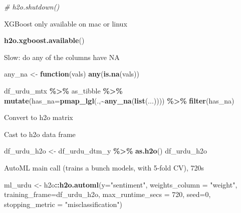 \documentclass[
]{article}
\newenvironment{Shaded}{\begin{snugshade}}{\end{snugshade}}
\newcommand{\CommentTok}[1]{\textcolor[rgb]{0.56,0.35,0.01}{\textit{#1}}}
\newcommand{\ControlFlowTok}[1]{\textcolor[rgb]{0.13,0.29,0.53}{\textbf{#1}}}
\newcommand{\DataTypeTok}[1]{\textcolor[rgb]{0.13,0.29,0.53}{#1}}
\newcommand{\DecValTok}[1]{\textcolor[rgb]{0.00,0.00,0.81}{#1}}
\newcommand{\KeywordTok}[1]{\textcolor[rgb]{0.13,0.29,0.53}{\textbf{#1}}}
\newcommand{\NormalTok}[1]{#1}
\newcommand{\OperatorTok}[1]{\textcolor[rgb]{0.81,0.36,0.00}{\textbf{#1}}}
\newcommand{\StringTok}[1]{\textcolor[rgb]{0.31,0.60,0.02}{#1}}
\begin{document}
\begin{Shaded}
\begin{Highlighting}[]
\CommentTok{\# h2o.shutdown()}
\end{Highlighting}
\end{Shaded}

XGBoost only available on mac or linux

\begin{Shaded}
\begin{Highlighting}[]
\KeywordTok{h2o.xgboost.available}\NormalTok{()}
\end{Highlighting}
\end{Shaded}

Slow: do any of the columns have NA

\begin{Shaded}
\begin{Highlighting}[]
\NormalTok{any\_na \textless{}{-}}\StringTok{ }\ControlFlowTok{function}\NormalTok{(vals) }\KeywordTok{any}\NormalTok{(}\KeywordTok{is.na}\NormalTok{(vals))}

\NormalTok{df\_urdu\_mtx }\OperatorTok{\%\textgreater{}\%}\StringTok{ }\NormalTok{as\_tibble }\OperatorTok{\%\textgreater{}\%}
\StringTok{  }\KeywordTok{mutate}\NormalTok{(}\DataTypeTok{has\_na=}\KeywordTok{pmap\_lgl}\NormalTok{(.,}\OperatorTok{\textasciitilde{}}\KeywordTok{any\_na}\NormalTok{(}\KeywordTok{list}\NormalTok{(...)))) }\OperatorTok{\%\textgreater{}\%}
\StringTok{  }\KeywordTok{filter}\NormalTok{(has\_na)}
\end{Highlighting}
\end{Shaded}

Convert to h2o matrix

Cast to h2o data frame

\begin{Shaded}
\begin{Highlighting}[]
\NormalTok{df\_urdu\_h2o \textless{}{-}}\StringTok{ }\NormalTok{df\_urdu\_dtm\_y }\OperatorTok{\%\textgreater{}\%}
\StringTok{  }\KeywordTok{as.h2o}\NormalTok{()}
\NormalTok{df\_urdu\_h2o}
\end{Highlighting}
\end{Shaded}

AutoML main call (trains a bunch models, with 5-fold CV), 720s

\begin{Shaded}
\begin{Highlighting}[]
\NormalTok{ml\_urdu \textless{}{-}}\StringTok{ }\NormalTok{h2o}\OperatorTok{::}\KeywordTok{h2o.automl}\NormalTok{(}\DataTypeTok{y=}\StringTok{"sentiment"}\NormalTok{,}
                           \DataTypeTok{weights\_column =} \StringTok{"weight"}\NormalTok{,}
                           \DataTypeTok{training\_frame=}\NormalTok{df\_urdu\_h2o,}
                           \DataTypeTok{max\_runtime\_secs =} \DecValTok{720}\NormalTok{,}
                           \DataTypeTok{seed=}\DecValTok{0}\NormalTok{,}
                           \DataTypeTok{stopping\_metric =} \StringTok{"misclassification"}\NormalTok{)}
\end{Highlighting}
\end{Shaded}
\end{document}
